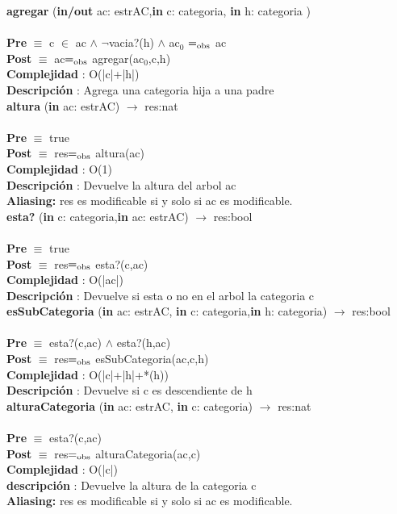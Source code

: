	\textbf{agregar} (\textbf{in/out} ac: estrAC,\textbf{in} c: categoria, \textbf{in} h: categoria )\\\\
	\textbf{Pre} $\equiv$ {c $\in$ ac $\wedge$ $¬$vacia?(h) $\wedge$ ac${_0}$ $=_{\mathrm{obs}}$ ac}\\
	\textbf{Post} $\equiv$ {ac$=_{\mathrm{obs}}$ agregar(ac${_0}$,c,h)}\\
	\textbf{Complejidad} : O(|c|+|h|)\\
	\textbf{Descripci\'{o}n} : Agrega una categoria hija a una padre\\
	
	\textbf{altura} (\textbf{in} ac: estrAC) $\longrightarrow$ res:nat\\\\
	\textbf{Pre} $\equiv$ {true}\\
	\textbf{Post} $\equiv$ {res$=_{\mathrm{obs}}$ altura(ac)}\\
	\textbf{Complejidad} : O(1)\\
	\textbf{Descripci\'{o}n} : Devuelve la altura del arbol ac\\
	\textbf{Aliasing: }{res es modificable si y solo si ac es modificable.}\\
	
	\textbf{esta?} (\textbf{in} c: categoria,\textbf{in} ac: estrAC) $\longrightarrow$ res:bool\\\\
	\textbf{Pre} $\equiv$ {true}\\
	\textbf{Post} $\equiv$ {res$=_{\mathrm{obs}}$ esta?(c,ac)}\\
	\textbf{Complejidad} : O(|ac|)\\
	\textbf{Descripci\'{o}n} : Devuelve si esta o no en el arbol la categoria c\\
	
	\textbf{esSubCategoria} (\textbf{in} ac: estrAC, \textbf{in} c: categoria,\textbf{in} h: categoria) $\longrightarrow$ res:bool\\\\
	\textbf{Pre} $\equiv$ {esta?(c,ac) $\wedge$ esta?(h,ac)}\\
	\textbf{Post} $\equiv$ {res$=_{\mathrm{obs}}$ esSubCategoria(ac,c,h)}\\
	\textbf{Complejidad} : O(|c|+|h|+*(h))\\
	\textbf{Descripci\'{o}n} : Devuelve si c es descendiente de h\\

	
	\textbf{alturaCategoria} (\textbf{in} ac: estrAC, \textbf{in} c: categoria) $\longrightarrow$ res:nat\\\\
	\textbf{Pre} $\equiv$ {esta?(c,ac)}\\
	\textbf{Post} $\equiv$ {res$=_{\mathrm{obs}}$ alturaCategoria(ac,c)}\\
	\textbf{Complejidad} : O(|c|)\\
	\textbf{descripci\'{o}n} : Devuelve la altura de la categoria c\\
	\textbf{Aliasing: }{res es modificable si y solo si ac es modificable.}\\
	
